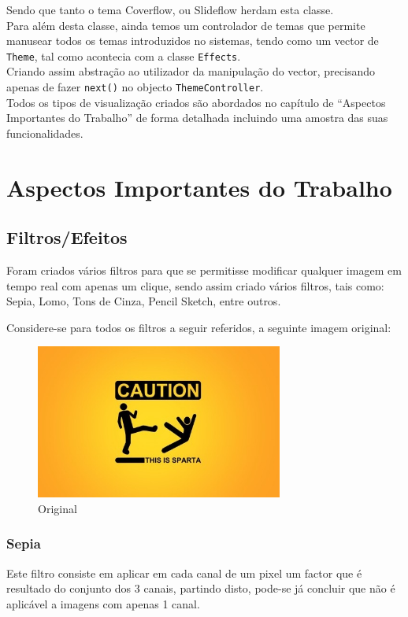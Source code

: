 \documentclass[portugues,final]{revdetua}
\begin{document}
Sendo que tanto o tema Coverflow, ou Slideflow herdam esta classe.\\

Para além desta classe, ainda temos um controlador de temas que permite manusear todos os temas introduzidos no sistemas, tendo como um vector de {\tt Theme}, tal como acontecia com a classe {\tt Effects}.\\

Criando assim abstração ao utilizador da manipulação do vector, precisando apenas de fazer {\tt next()} no objecto {\tt ThemeController}.\\

Todos os tipos de visualização criados são abordados no capítulo de ``Aspectos Importantes do Trabalho'' de forma detalhada incluindo uma amostra das suas funcionalidades.\break

\section{Aspectos Importantes do Trabalho}

\subsection{Filtros/Efeitos}
Foram criados vários filtros para que se permitisse modificar qualquer imagem em tempo real com apenas um clique, sendo assim criado vários filtros, tais como: Sepia, Lomo, Tons de Cinza, Pencil Sketch, entre outros.

Considere-se para todos os filtros a seguir referidos, a seguinte imagem original:
\begin{figure}[H]
\centerline{\includegraphics[width=230pt]{images/original.jpeg}}
\caption{Original}
\label{img:complete}
\end{figure}

\subsubsection{Sepia}
Este filtro consiste em aplicar em cada canal de um pixel um factor que é resultado do conjunto dos 3 canais, partindo disto, pode-se já concluir que não é aplicável a imagens com apenas 1 canal.\\
\end{document}
